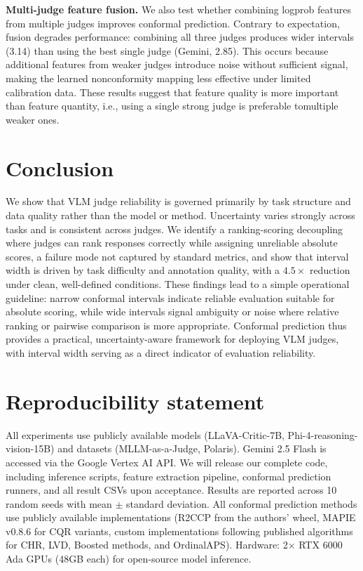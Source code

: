 \documentclass{article}
\begin{document}
\textbf{Multi-judge feature fusion.}
We also test whether combining logprob features from multiple judges improves conformal prediction. Contrary to expectation, fusion degrades performance: combining all three judges produces wider intervals (3.14) than using the best single judge (Gemini, 2.85). This occurs because additional features from weaker judges introduce noise without sufficient signal, making the learned nonconformity mapping less effective under limited calibration data. These results suggest that feature quality is more important than feature quantity, i.e., using a single strong judge is preferable tomultiple weaker ones.

\section{Conclusion}
\label{sec:conclusion}

We show that VLM judge reliability is governed primarily by task structure and data quality rather than the model or method. Uncertainty varies strongly across tasks and is consistent across judges. We identify a ranking-scoring decoupling where judges can rank responses correctly while assigning unreliable absolute scores, a failure mode not captured by standard metrics, and show that interval width is driven by task difficulty and annotation quality, with a $4.5\times$ reduction under clean, well-defined conditions. These findings lead to a simple operational guideline: narrow conformal intervals indicate reliable evaluation suitable for absolute scoring, while wide intervals signal ambiguity or noise where relative ranking or pairwise comparison is more appropriate. Conformal prediction thus provides a practical, uncertainty-aware framework for deploying VLM judges, with interval width serving as a direct indicator of evaluation reliability.


\pagebreak


\section*{Reproducibility statement}
All experiments use publicly available models (LLaVA-Critic-7B, Phi-4-reasoning-vision-15B) and datasets (MLLM-as-a-Judge, Polaris). Gemini 2.5 Flash is accessed via the Google Vertex AI API. We will release our complete code, including inference scripts, feature extraction pipeline, conformal prediction runners, and all result CSVs upon acceptance. Results are reported across 10 random seeds with mean $\pm$ standard deviation. All conformal prediction methods use publicly available implementations (R2CCP from the authors' wheel, MAPIE v0.8.6 for CQR variants, custom implementations following published algorithms for CHR, LVD, Boosted methods, and OrdinalAPS). Hardware: 2$\times$ RTX 6000 Ada GPUs (48GB each) for open-source model inference.
\end{document}
